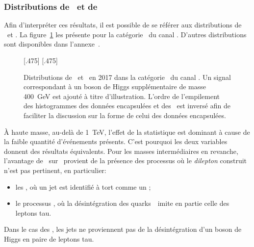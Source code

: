 \subsubsection{Distributions de \mml\ et de \mTtot}
Afin d'interpréter ces résultats, il est possible de se référer aux distributions de \mTtot\ et \mml.
La figure~\ref{fig-distributions_mml_mttot_2017_tt_btag} les présente pour la catégorie \CATbtag\ du canal \tauh\tauh.
D'autres distributions sont disponibles dans l'annexe~.
\begin{figure}[h]
\centering

[.475\textwidth]
{}
\hfill
{}[.475\textwidth]
{}

\caption[Distributions de \mTtot\ et \mml\ en 2017 dans la catégorie \CATbtag\ du canal \tauh\tauh.]{Distributions de \mTtot\ et \mml\ en 2017 dans la catégorie \CATbtag\ du canal \tauh\tauh. Un signal correspondant à un boson de Higgs supplémentaire de masse \SI{400}{\GeV} est ajouté à titre d'illustration. L'ordre de l'empilement des histogrammes des données encapsulées et des \ftauhs\ est inversé afin de faciliter la discussion sur la forme de celui des données encapsulées.}
\label{fig-distributions_mml_mttot_2017_tt_btag}
\end{figure}
\par
À haute masse,
au-delà de \SI{1}{\TeV},
l'effet de la statistique est dominant
à cause de la faible quantité d'événements présents.
C'est pourquoi les deux variables donnent des résultats équivalents.
Pour les masses intermédiaires en revanche,
l'avantage de \mTtot\ sur \mml\ provient de la présence des processus où
le \emph{dilepton} construit n'est pas pertinent,
en particulier:
\begin{itemize}
\item les \ftauhs, où un jet est identifié à tort comme un \tauh;
\item le processus \ttbar, où la désintégration des quarks~\quarkt\ imite en partie celle des leptons tau.
\end{itemize}
\par
Dans le cas des \ftauhs,
les jets ne proviennent pas de la désintégration d'un boson de Higgs en paire de leptons tau.

